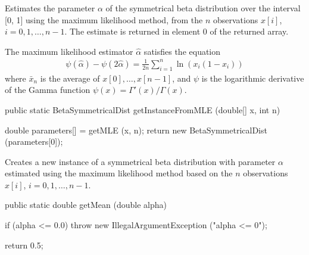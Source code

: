 \begin{tabb}
   Estimates the parameter $\alpha$ of the symmetrical beta  distribution
   over the interval [0, 1] using the maximum likelihood method, from the
   $n$ observations $x[i]$, $i = 0, 1, \ldots, n-1$. The estimate is returned
   in element 0 of the returned array.
   \begin{detailed}
   The maximum likelihood estimator $\hat{\alpha}$ satisfies the equation
   \begin{eqnarray*}
  \psi(\hat\alpha) - \psi(2\hat\alpha) = \frac1{2n} \sum_{i=1}^{n} \ln(x_i(1 - x_i))
   \end{eqnarray*}
   where  $\bar{x}_n$ is the average of $x[0], \ldots, x[n-1]$, and
   $\psi$ is the logarithmic derivative of the Gamma function
   $\psi(x) = \Gamma'(x) / \Gamma(x)$.
   \end{detailed}
\end{tabb}
\begin{htmlonly}
\end{htmlonly}
\begin{code}

   public static BetaSymmetricalDist getInstanceFromMLE (double[] x, int n)\begin{hide} {
      double parameters[] = getMLE (x, n);
      return new BetaSymmetricalDist (parameters[0]);
   }\end{hide}
\end{code}
\begin{tabb}
   Creates a new instance of a symmetrical beta distribution with parameter $\alpha$
   estimated using the maximum likelihood method based on the $n$ observations
   $x[i]$, $i = 0, 1, \ldots, n-1$.
\end{tabb}
\begin{htmlonly}
\end{htmlonly}
\begin{code}

   public static double getMean (double alpha)\begin{hide} {
      if (alpha <= 0.0)
         throw new IllegalArgumentException ("alpha <= 0");

      return 0.5;
   }\end{hide}
\end{code}
